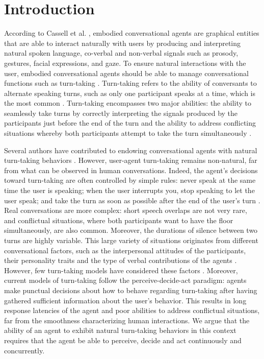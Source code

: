 \documentclass[twocolumn]{svjour3}
\begin{document}
\section{Introduction}
\label{sec:intro}

According to Cassell et al. \cite{cassell_embodiment_1999}, embodied conversational agents are graphical entities that are able to interact naturally with users by producing and interpreting natural spoken language, co-verbal and non-verbal signals such as prosody, gestures, facial expressions, and gaze. 
To ensure natural interactions with the user, embodied conversational agents should be able to manage conversational functions such as turn-taking \citep{cassell_embodiment_1999}. Turn-taking refers to the ability of conversants to alternate speaking turns, such as only one participant speaks at a time, which is the most common \citep{sacks_simplest_1974}. Turn-taking encompasses two major abilities: the ability to seamlessly take turns by correctly interpreting the signals produced by the participants just before the end of the turn and the ability to address conflicting situations whereby both participants attempt to take the turn simultaneously \citep{thorisson_natural_2002}. 

Several authors have contributed to endowing conversational agents with natural turn-taking behaviors \citep{thorisson_natural_2002,raux_optimizing_2012,jonsdottir_distributed_2013}. However, user-agent turn-taking remains non-natural, far from what can be observed in human conversations. Indeed, the agent's decisions toward turn-taking are often controlled by simple rules: never speak at the same time the user is speaking; when the user interrupts you, stop speaking to let the user speak; and take the turn as soon as possible after the end of the user's turn \citep{ter_maat_how_2010}. Real conversations are more complex: short speech overlaps are not very rare, and conflictual situations, where both participants want to have the floor simultaneously, are also common. Moreover, the durations of silence between two turns are highly variable. This large variety of situations originates from different conversational factors, such as the interpersonal attitudes of the participants, their personality traits \citep{ter_maat_how_2010} and the type of verbal contributions of the agents \citep{cafaro_effects_2016}. However,  few turn-taking models have considered these factors \citep{lessmann_towards_2004,ravenet_conversational_2015}.
Moreover, current models of turn-taking follow the perceive-decide-act paradigm: agents make punctual decisions about how to behave regarding turn-taking after having gathered sufficient information about the user's behavior. This results in long response latencies of the agent and poor abilities to address conflictual situations, far from the smoothness characterizing human interactions. We argue that the ability of an agent to exhibit natural turn-taking behaviors in this context requires that the agent be able to perceive, decide and act continuously and concurrently.  
\end{document}
